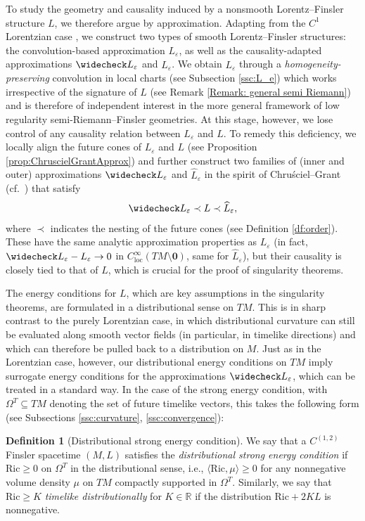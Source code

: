 \documentclass[a4paper,11pt]{article}
\numberwithin{equation}{section}
\theoremstyle{definition}
\newtheorem{Definition}{Definition}[section]
\theoremstyle{plain}
\newcommand{\R}{\mathbb R}
\newcommand{\eps}{\varepsilon}
\newcommand{\Ric}{\mathrm{Ric}}
\begin{document}
To study the geometry and causality induced by a nonsmooth Lorentz--Finsler structure $L$, we therefore argue by approximation. 
Adapting from the $C^1$ Lorentzian case \cite{Graf-SingularityC1, KOSS}, we construct two types of smooth Lorentz--Finsler structures: the convolution-based approximation $L_\varepsilon$, as well as the causality-adapted approximations $\widecheck L_\varepsilon$ and $\widehat L_\varepsilon$.
We obtain $L_\varepsilon$ through a \emph{homogeneity-preserving} convolution in local charts (see Subsection \ref{ssc:L_e}) which works irrespective of the signature of $L$ (see Remark \ref{Remark: general semi Riemann}) and is therefore of independent interest in the more general framework of low regularity semi-Riemann--Finsler geometries.
At this stage, however, we lose control of any causality relation between $L_\eps$ and $L$.
To remedy this deficiency, we locally align the future cones of $L_\varepsilon$ and $L$ (see Proposition \ref{prop:ChruscielGrantApprox}) and further construct two families of (inner and outer) approximations $\widecheck L_\eps$ and $\widehat L_\eps$ in the spirit of Chru\'sciel--Grant (cf.\ \cite{ChruscielGrant}) that satisfy 
\[
\widecheck L_\varepsilon \prec L \prec \widehat L_\varepsilon,
\]
where $\prec$ indicates the nesting of the future cones (see Definition \ref{df:order}).
These have the same analytic approximation properties as $L_\varepsilon$ (in fact, $\widecheck L_\varepsilon - L_\varepsilon \to 0$ in $C^\infty_{\mathrm{loc}}(TM \setminus \mathbf{0})$, same for $\widehat L_\varepsilon$), but their causality is closely tied to that of $L$, which is crucial for the proof of singularity theorems.

The energy conditions for $L$, which are key assumptions in the singularity theorems, are formulated in a distributional sense on $TM$. 
This is in sharp contrast to the purely Lorentzian case, in which distributional curvature can still be evaluated along smooth vector fields (in particular, in timelike directions) and which can therefore be pulled back to a distribution on $M$. 
Just as in the Lorentzian case, however, our distributional energy conditions on $TM$ imply surrogate energy conditions for the approximations $\widecheck L_\varepsilon$, which can be treated in a standard way. 
In the case of the strong energy condition, with $\Omega^T \subseteq TM$ denoting the set of future timelike vectors, this takes the following form (see Subsections \ref{ssc:curvature}, \ref{ssc:convergence}):

\begin{Definition}[Distributional strong energy condition]
We say that a $C^{(1,2)}$ Finsler spacetime $(M,L)$ satisfies the \emph{distributional strong energy condition} if $\Ric \geq 0$ on $\Omega^T$ in the distributional sense, i.e., $\langle \Ric, \mu\rangle \geq 0$ for any nonnegative volume density $\mu$ on $TM$ compactly supported in $\Omega^T$.
Similarly, we say that $\Ric \geq K$ \emph{timelike distributionally} for $K \in \R$ if the distribution $\Ric + 2 K L$ is nonnegative.
\end{Definition}
\end{document}

